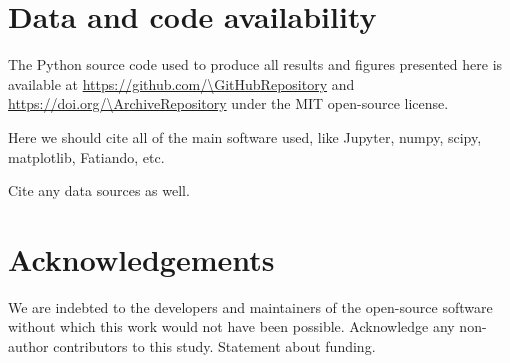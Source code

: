 \section{Data and code availability}

The Python source code used to produce all results and figures presented here
is available at \url{https://github.com/\GitHubRepository} and
\url{https://doi.org/\ArchiveRepository} under the MIT open-source license.

Here we should cite all of the main software used, like Jupyter, numpy, scipy,
matplotlib, Fatiando, etc.

Cite any data sources as well.



\section{Acknowledgements}

We are indebted to the developers and maintainers of the open-source software
without which this work would not have been possible.
Acknowledge any non-author contributors to this study.
Statement about funding.

